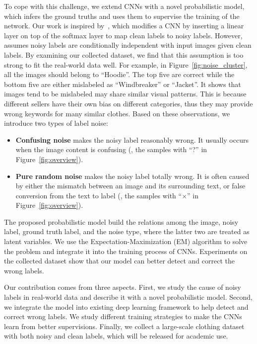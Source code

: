 \documentclass[10pt,twocolumn,letterpaper]{article}
\begin{document}
To cope with this challenge, we extend CNNs with a novel probabilistic model, which infers the ground truths and uses them to supervise the training of the network. Our work is inspired by~\cite{sukhbaatar2014learning}, which modifies a CNN by inserting a linear layer on top of the softmax layer to map clean labels to noisy labels. However,~\cite{sukhbaatar2014learning} assumes noisy labels are conditionally independent with input images given clean labels. By examining our collected dataset, we find that this assumption is too strong to fit the real-world data well. For example, in Figure~\ref{fig:noise_cluster}, all the images should belong to ``Hoodie''. The top five are correct while the bottom five are either mislabeled as ``Windbreaker'' or ``Jacket''. It shows that images tend to be mislabeled may share similar visual patterns. This is because different sellers have their own bias on different categories, thus they may provide wrong keywords for many similar clothes. Based on these observations, we introduce two types of label noise:
\begin{itemize}
\item \textbf{Confusing noise} makes the noisy label reasonably wrong. It usually occurs when the image content is confusing (\eg, the samples with ``?'' in Figure~\ref{fig:overview}).
\item \textbf{Pure random noise} makes the noisy label totally wrong. It is often caused by either the mismatch between an image and its surrounding text, or false conversion from the text to label (\eg, the samples with ``$\times$'' in Figure~\ref{fig:overview}).
\end{itemize}

The proposed probabilistic model build the relations among the image, noisy label, ground truth label, and the noise type, where the latter two are treated as latent variables. We use the Expectation-Maximization (EM) algorithm to solve the problem and integrate it into the training process of CNNs. Experiments on the collected dataset show that our model can better detect and correct the wrong labels.

Our contribution comes from three aspects. First, we study the cause of noisy labels in real-world data and describe it with a novel probabilistic model. Second, we integrate the model into existing deep learning framework to help detect and correct wrong labels. We study different training strategies to make the CNNs learn from better supervisions. Finally, we collect a large-scale clothing dataset with both noisy and clean labels, which will be released for academic use.
\end{document}
